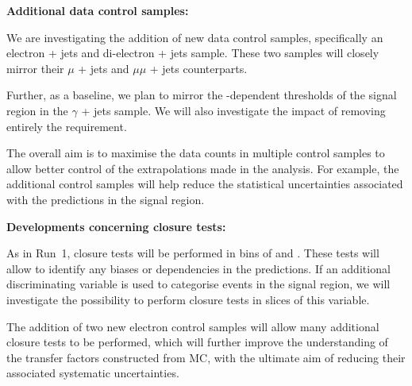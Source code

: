 {\bf Additional data control samples:}

We are investigating the addition of new data control samples,
specifically an electron + jets and di-electron + jets sample. These
two samples will closely mirror their $\mu$ + jets and $\mu\mu$ + jets
counterparts. 

Further, as a baseline, we plan to mirror the \scalht-dependent
\alphat thresholds of the signal region in the $\gamma$ + jets
sample. We will also investigate the impact of removing entirely the
\alphat requirement. 

The overall aim is to maximise the data counts in multiple control
samples to allow better control of the extrapolations made in the
analysis. For example, the additional control samples will help reduce
the statistical uncertainties associated with the predictions in the
signal region.

{\bf Developments concerning closure tests:}

As in Run~1, closure tests will be performed in bins of \njet and
\scalht. These tests will allow to identify any biases or dependencies
in the predictions. If an additional discriminating variable is used
to categorise events in the signal region, we will investigate the
possibility to perform closure tests in slices of this variable.

The addition of two new electron control samples will allow many
additional closure tests to be performed, which will further improve
the understanding of the transfer factors constructed from MC, with
the ultimate aim of reducing their associated systematic
uncertainties.

